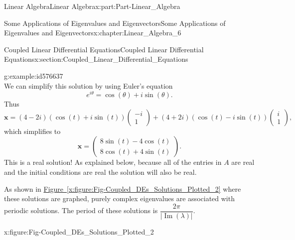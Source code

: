\documentclass[oneside,10pt,]{book}
\newcommand{\xreffont}{\relax}
\numberwithin{equation}{section}
\newcommand{\bm}[1]{\boldsymbol{#1}}
\begin{document}
\begin{partptx}{Linear Algebra}{}{Linear Algebra}{}{}{x:part:Part-Linear_Algebra}
\begin{chapterptx}{Some Applications of Eigenvalues and Eigenvectors}{}{Some Applications of Eigenvalues and Eigenvectors}{}{}{x:chapter:Linear_Algebra_6}
\begin{sectionptx}{Coupled Linear Differential Equations}{}{Coupled Linear Differential Equations}{}{}{x:section:Coupled_Linear_Differential_Equations}
\begin{example}{}{g:example:id576637}
\begin{equation*}
\end{equation*}
We can simplify this solution by using Euler's equation%
\begin{equation*}
e^{i \theta} = \cos( \theta ) + i \sin( \theta )\text{.}
\end{equation*}
Thus%
\begin{equation*}
\bm{x} = (4-2i) \left( \cos(t) + i\sin(t) \right) \begin{pmatrix} -i \\ 1 \end{pmatrix} + (4+2i) \left( \cos(t) - i \sin(t) \right) \begin{pmatrix} i \\ 1 \end{pmatrix}\text{,}
\end{equation*}
which simplifies to%
\begin{equation*}
\bm{x} = \begin{pmatrix} 8 \sin(t) - 4 \cos(t) \\ 8 \cos(t) + 4 \sin(t) \end{pmatrix}\text{.}
\end{equation*}
This is a real solution! As explained below, because all of the entries in \(A\) are real and the initial conditions are real the solution will also be real.%
\par
As shown in \hyperref[x:figure:Fig-Coupled_DEs_Solutions_Plotted_2]{Figure~{\xreffont\ref{x:figure:Fig-Coupled_DEs_Solutions_Plotted_2}}} where these solutions are graphed, purely complex eigenvalues are associated with periodic solutions. The period of these solutions is \(\dfrac{2 \pi}{| \operatorname{Im}(\lambda) |}\).%
\begin{figureptx}{}{x:figure:Fig-Coupled_DEs_Solutions_Plotted_2}{}%
\begin{image}{0.15}{0.7}{0.15}%

\end{image}
\end{figureptx}
\end{example}
\end{sectionptx}
\end{chapterptx}
\end{partptx}
\end{document}

